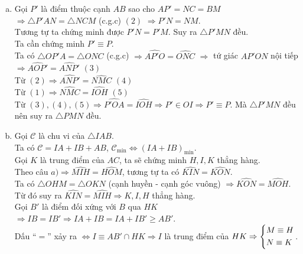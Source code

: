 \begin{ex}
{\begin{enumerate}[a)]
		Vậy $\triangle BOM = \triangle CON$ (c.g.c) $\Rightarrow OM = ON \Rightarrow \triangle OMN$ cân tại $O$. \\
		Mặt khác ta có $I$ là trung điểm của $MN$ $\Rightarrow OI \perp MN$ hay $\triangle OIM$ vuông tại $I$. \\
		Tứ giác $OMHI$ có $I,H$ cùng nhìn đoạn thẳng $OM$ dưới một góc vuông nên $OMHI$ là tứ giác nội tiếp. \hfill $(1)$ \\
		Do đó bốn điểm $O$, $M$, $H$, $I$ cùng thuộc một đường tròn.
		\item Gọi $P'$ là điểm thuộc cạnh $AB$ sao cho $AP'=NC=BM$ $\Rightarrow \triangle P'AN  = \triangle NCM$ (c.g.c) \hfill $(2)$ $\Rightarrow P'N = NM$. \\
		Tương tự ta chứng minh được $P'N = P'M$. Suy ra $\triangle P'MN$ đều.\\
		Ta cần chứng minh $P' \equiv P$. \\
		Ta có $\triangle OP'A = \triangle ONC$ (c.g.c) $\Rightarrow \widehat{AP'O} = \widehat{ONC}$ $\Rightarrow$ tứ giác $AP'ON$ nội tiếp \\
		$\Rightarrow \widehat{AOP'} = \widehat{ANP'}$ \hfill $(3)$ \\
		Từ $(2) \Rightarrow \widehat{ANP'} = \widehat{NMC}$ \hfill $(4)$ \\
		Từ $(1) \Rightarrow \widehat{NMC} = \widehat{IOH}$ \hfill$(5)$ \\
		Từ $(3),(4),(5) \Rightarrow \widehat{P'OA} = \widehat{IOH} \Rightarrow P' \in OI \Rightarrow P' \equiv P$. Mà $\triangle P'MN$ đều nên suy ra $\triangle PMN$ đều.
		\item Gọi $\mathscr{C}$ là chu vi của $\triangle IAB$. \\
		Ta có $\mathscr{C}=IA+IB+AB$, $\mathscr{C}_{\min} \Leftrightarrow (IA+IB)_{\min}$. \\
		Gọi $K$ là trung điểm của $AC$, ta sẽ chứng minh $H,I,K$ thẳng hàng. \\
		Theo câu $a) \Rightarrow \widehat{MIH} = \widehat{HOM}$, tương tự ta có $\widehat{KIN} = \widehat{KON}$. \\
		Ta có $\triangle OHM = \triangle OKN$ (cạnh huyền - cạnh góc vuông) $\Rightarrow \widehat{KON} = \widehat{MOH}$. Từ đó suy ra $\widehat{KIN} = \widehat{MIH} \Rightarrow K,I,H$ thẳng hàng. \\
		Gọi $B'$ là điểm đối xứng với $B$ qua $HK$ $\Rightarrow IB = IB' \Rightarrow IA + IB = IA + IB' \ge AB'$.\\
		 Dấu ``$=$'' xảy ra $\Leftrightarrow I \equiv AB' \cap HK \Rightarrow I$ là trung điểm của $HK \Rightarrow \left\{\begin{aligned}&M \equiv H \\ &N \equiv K\end{aligned}\right.$.
	\end{enumerate}
}
\end{ex}

